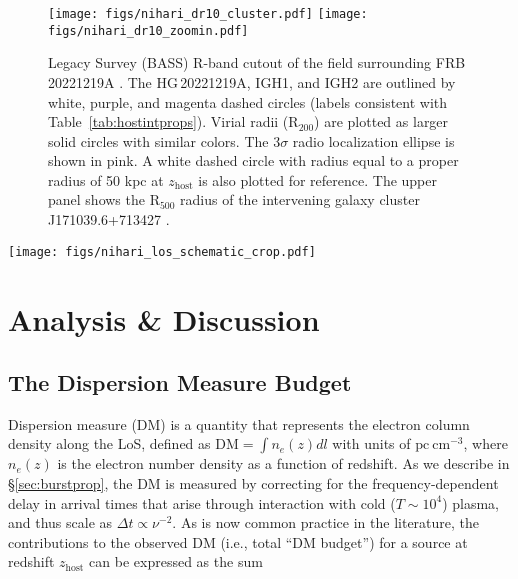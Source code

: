 \documentclass[twocolumn, linenumbers, tra]{aastex631}
\newcommand{\nihari}{FRB\,20221219A } %
\begin{document}
\begin{figure}
  \centering
  \hspace{-1 cm}
  \hspace{0.88 cm}\texttt{[image: figs/nihari\_dr10\_cluster.pdf]}\vspace{-0.45 cm}
  \texttt{[image: figs/nihari\_dr10\_zoomin.pdf]}
  \caption{Legacy Survey (BASS) R-band cutout of the field surrounding \nihari. The HG\,20221219A, IGH1, and IGH2 are outlined by white, purple, and magenta dashed circles (labels consistent with Table~\ref{tab:hostintprops}). Virial radii ($\mathrm{R}_{200}$) are plotted as larger solid circles with similar colors. The 3$\sigma$ radio localization ellipse is shown in pink. A white dashed circle with radius equal to a proper radius of 50 kpc at $z_{\mathrm{host}}$ is also plotted for reference. The upper panel shows the $\mathrm{R}_{500}$ radius of the intervening galaxy cluster J171039.6+713427 \citep{Wen2018}.}
  \label{fig:niharidesifield}
\end{figure}

\begin{figure*}
  \centering
  \texttt{[image: figs/nihari\_los\_schematic\_crop.pdf]}
  \caption{A schematic of the LoS toward \nihari, that shows HG\,20221219A, IGH1, and IGH2, including impact parameters ($b$) and virial radii ($\mathrm{R}_{200}$). The intervening galaxy cluster J171039.6+713427 is also shown, outlined by its $\mathrm{R}_{500}$ radius \citep{Wen2018}. Note that the shaded circles indicating virial extent are not drawn to scale in the longitudinal (LoS) direction, hence the coverage of the shaded regions in this direction is inflated.}
  \label{fig:niharilos}
\end{figure*}

\section{Analysis \& Discussion} \label{sec:analysis}

\subsection{The Dispersion Measure Budget} \label{sec:dmbudget}

Dispersion measure (DM) is a quantity that represents the electron column density along the LoS, defined as $\mathrm{DM}=\int n_e(z) d l$ with units of $\mathrm{pc\ cm}^{-3}$, where $n_e(z)$ is the electron number density as a function of redshift. As we describe in \S\ref{sec:burstprop}, the DM is measured by correcting for the frequency-dependent delay in arrival times that arise through interaction with cold ($T \sim 10^4$) plasma, and thus scale as $\Delta t \propto \nu^{-2}$. As is now common practice in the literature, the contributions to the observed DM (i.e., total ``DM budget'') for a source at redshift $z_{\mathrm{host}}$ can be expressed as the sum
\end{document}
